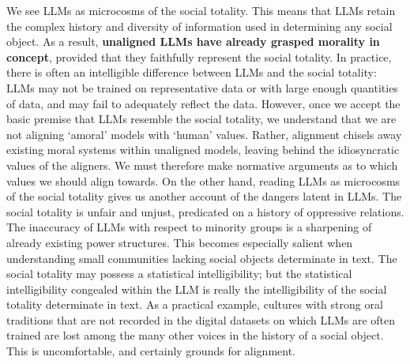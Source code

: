We see LLMs as microcosms of the social totality. This means that LLMs retain the complex history and diversity of information used in determining any social object.
As a result, \textbf{unaligned LLMs have already grasped morality in concept}, provided that they faithfully represent the social totality. In practice, there is often an intelligible difference between LLMs and the social totality: LLMs may not be trained on representative data or with large enough quantities of data, and may fail to adequately reflect the data.
However, once we accept the basic premise that LLMs resemble the social totality, we understand that we are not aligning `amoral' models with `human' values. Rather, alignment chisels away existing moral systems within unaligned models, leaving behind the
idiosyncratic values
of the aligners.
We must therefore make normative arguments as to which values we should align towards. On the other hand, reading LLMs as microcosms of the social totality gives us another account of the dangers latent in LLMs. The social totality is unfair and unjust,
predicated on a history of oppressive relations.
The inaccuracy of LLMs with respect to minority groups is a sharpening of already existing power structures. This becomes especially salient when understanding small communities lacking social objects determinate in text. The social totality may possess a statistical intelligibility; but the statistical intelligibility congealed within the LLM is really the intelligibility of the social totality determinate in text. As a practical example, cultures with strong oral traditions that are not recorded in the digital datasets on which LLMs are often trained are lost among the many other voices in the history of a social object.
This is uncomfortable, and certainly grounds for alignment.


